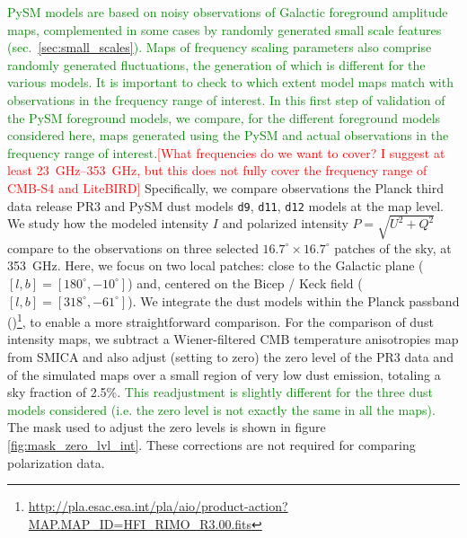 \documentclass[twocolumn]{aastex631}
\newcommand{\dnine}{{\tt d9}}
\newcommand{\jd}[1]{\textcolor{green}{#1}}
\begin{document}
\jd{PySM models are based on noisy observations of Galactic foreground amplitude maps, complemented in some cases by randomly generated small scale features (sec.~\ref{sec:small_scales}). Maps of frequency scaling parameters also comprise randomly generated fluctuations, the generation of which is different for the various models. It is important to check to which extent model maps match with observations in the frequency range of interest. In this first step of validation of the PySM foreground models, we compare, for the different foreground models considered here, maps generated using the PySM and actual observations in the frequency range of interest.}\textcolor{red}{[What frequencies do we want to cover? I suggest at least 23~GHz--353~GHz, but this does not fully cover the frequency range of CMB-S4 and LiteBIRD]}
Specifically, we compare observations the Planck third data release PR3 \cite{planck2016-l03} and PySM dust models \dnine{}, {\tt d11}, {\tt d12} models at the map level. We study how the modeled intensity $I$ and polarized intensity $P = \sqrt{U^2 + Q^2}$ compare to the observations on three selected $16.7^\circ \times 16.7^\circ$ patches of the sky, at 353~GHz. Here, we focus on two local patches: close to the Galactic plane ($[l,b] =[180^\circ,-10^\circ]$) and, centered on the Bicep / Keck field ($[l,b] =[318^\circ,-61^\circ]$).
We integrate the dust models within the Planck passband (\cite{planck2013-p03d})\footnote{\url{http://pla.esac.esa.int/pla/aio/product-action?MAP.MAP_ID=HFI_RIMO_R3.00.fits}}, to enable a more straightforward comparison. For the comparison of dust intensity maps, we subtract a Wiener-filtered CMB temperature anisotropies map from SMICA and also adjust (setting to zero) the zero level of the PR3 data and of the simulated maps over a small region of very low dust emission, totaling a sky fraction of 2.5\%.
\jd{This readjustment is slightly different for the three dust models considered (i.e. the zero level is not exactly the same in all the maps).}
The mask used to adjust the zero levels is shown in figure \ref{fig:mask_zero_lvl_int}. These corrections are not required for comparing polarization data. 
\end{document}
